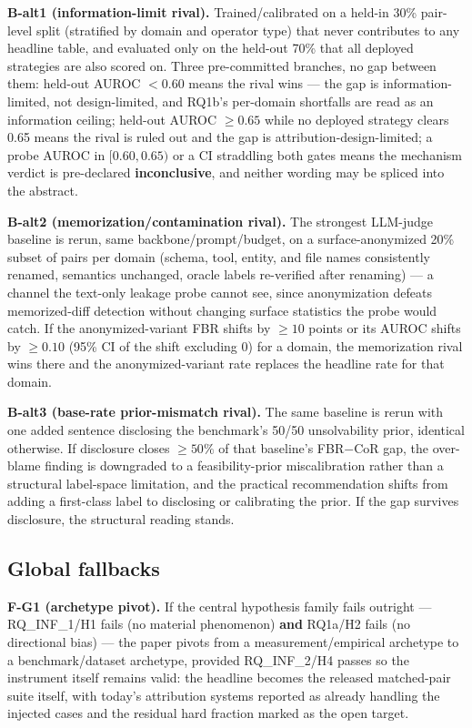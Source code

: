 \documentclass[11pt]{article}
\begin{document}
\textbf{B-alt1 (information-limit rival).} Trained/calibrated on a held-in 30\% pair-level split (stratified by domain and operator type) that never contributes to any headline table, and evaluated only on the held-out 70\% that all deployed strategies are also scored on. Three pre-committed branches, no gap between them: held-out AUROC $< 0.60$ means the rival wins --- the gap is information-limited, not design-limited, and RQ1b's per-domain shortfalls are read as an information ceiling; held-out AUROC $\geq 0.65$ while no deployed strategy clears 0.65 means the rival is ruled out and the gap is attribution-design-limited; a probe AUROC in $[0.60, 0.65)$ or a CI straddling both gates means the mechanism verdict is pre-declared \textbf{inconclusive}, and neither wording may be spliced into the abstract.

\textbf{B-alt2 (memorization/contamination rival).} The strongest LLM-judge baseline is rerun, same backbone/prompt/budget, on a surface-anonymized 20\% subset of pairs per domain (schema, tool, entity, and file names consistently renamed, semantics unchanged, oracle labels re-verified after renaming) --- a channel the text-only leakage probe cannot see, since anonymization defeats memorized-diff detection without changing surface statistics the probe would catch. If the anonymized-variant FBR shifts by $\geq 10$ points or its AUROC shifts by $\geq 0.10$ (95\% CI of the shift excluding 0) for a domain, the memorization rival wins there and the anonymized-variant rate replaces the headline rate for that domain.

\textbf{B-alt3 (base-rate prior-mismatch rival).} The same baseline is rerun with one added sentence disclosing the benchmark's 50/50 unsolvability prior, identical otherwise. If disclosure closes $\geq 50\%$ of that baseline's FBR$-$CoR gap, the over-blame finding is downgraded to a feasibility-prior miscalibration rather than a structural label-space limitation, and the practical recommendation shifts from adding a first-class label to disclosing or calibrating the prior. If the gap survives disclosure, the structural reading stands.

\subsection{Global fallbacks}

\textbf{F-G1 (archetype pivot).} If the central hypothesis family fails outright --- RQ\_INF\_1/H1 fails (no material phenomenon) \textbf{and} RQ1a/H2 fails (no directional bias) --- the paper pivots from a measurement/empirical archetype to a benchmark/dataset archetype, provided RQ\_INF\_2/H4 passes so the instrument itself remains valid: the headline becomes the released matched-pair suite itself, with today's attribution systems reported as already handling the injected cases and the residual hard fraction marked as the open target.
\end{document}
